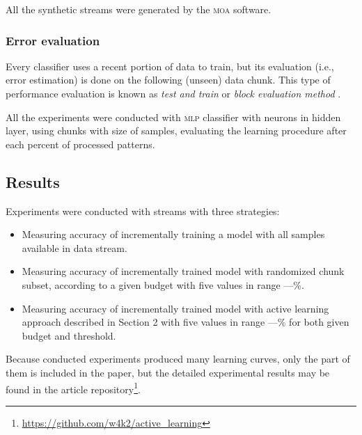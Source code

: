 All the synthetic streams were generated by the \textsc{moa} software.

\subsubsection{Error evaluation}

\noindent Every classifier uses a recent portion of data to train, but its evaluation (i.e., error estimation) is done on the following (unseen) data chunk. This type of performance evaluation is known as \emph{test and train} or \emph{block evaluation method} \cite{Bifet:2010}. 

All the experiments were conducted with \textsc{mlp} classifier with  neurons in hidden layer, using chunks with size of  samples, evaluating the learning procedure after each percent of processed patterns.


\subsection{Results}
\label{subsec:exp:results}
\noindent Experiments were conducted with  streams with three strategies:

\begin{itemize}
	\item Measuring accuracy of incrementally training a model with all samples available in data stream.
	\item Measuring accuracy of incrementally trained model with randomized chunk subset, according to a given budget with five values in range ---\%.
	\item Measuring accuracy of incrementally trained model with active learning approach described in Section 2 with five values in range ---\% for both given budget and threshold.
\end{itemize}

Because conducted experiments produced many learning curves, only the part of them is included in the paper, but the detailed experimental results may be found in the article repository\footnote{\url{https://github.com/w4k2/active_learning}}.

